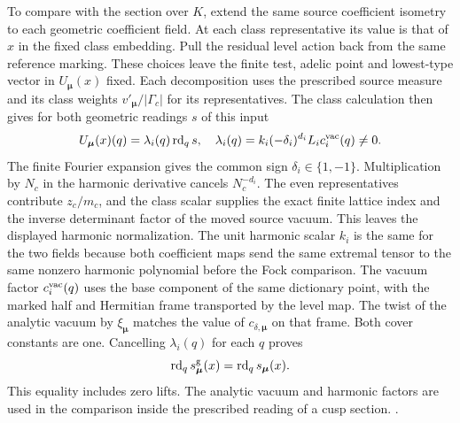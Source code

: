 To compare with the section over \(K\), extend the same
source coefficient isometry to each geometric coefficient
field. At each class representative its value is that of
\(x\) in the fixed class embedding. Pull the residual level
action back from the same reference marking. These choices
leave the finite test, adelic point and lowest-type vector in
\(U_{\boldsymbol\mu}(x)\) fixed. Each decomposition uses the
prescribed source measure and its class weights
\(v'_{\boldsymbol\mu}/|\Gamma_c|\) for its representatives.
The class calculation then gives for both geometric
readings \(s\) of this input
\[
 U_{\boldsymbol\mu}(x)(q)
   = \lambda_i(q)\operatorname{rd}_{q}s,
 \quad
 \lambda_i(q)=k_i(-\delta_i)^{d_i}L_i c_i^{\rm vac}(q)\ne0.
\]
The finite Fourier expansion gives the common sign
\(\delta_i\in\{1,-1\}\). Multiplication by \(N_c\) in the
harmonic derivative cancels \(N_c^{-d_i}\). The even
representatives contribute \(z_c/m_c\), and the class scalar
supplies the exact finite lattice index and the inverse
determinant factor of the moved source vacuum. This leaves
the displayed harmonic normalization. The unit harmonic
scalar \(k_i\) is the same for the two fields because both
coefficient maps send the same extremal tensor to the same
nonzero harmonic polynomial before the Fock comparison. The
vacuum factor \(c_i^{\rm vac}(q)\) uses the base component of
the same dictionary point, with the marked half and Hermitian
frame transported by the level map. The twist of the analytic
vacuum by \(\xi_{\boldsymbol\mu}\) matches the value of
\(c_{\delta,\boldsymbol\mu}\) on that frame. Both cover
constants are one. Cancelling \(\lambda_i(q)\) for each
\(q\) proves
\[ \operatorname{rd}_{q}s^{\rm g}_{\boldsymbol\mu}(x)
      =\operatorname{rd}_{q}s_{\boldsymbol\mu}(x). \]
This equality includes zero lifts. The analytic vacuum and
harmonic factors are used in the comparison inside the
prescribed reading of a cusp section.
.

